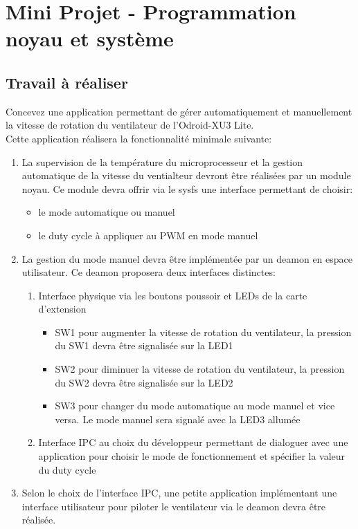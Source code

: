\section{Mini Projet - Programmation noyau et système}
\subsection{Travail à réaliser}
Concevez une application permettant de gérer automatiquement et manuellement la vitesse de rotation du ventilateur de l'Odroid-XU3 Lite.\\
Cette application réalisera la fonctionnalité minimale suivante:
\begin{enumerate}
	\item La supervision de la température du microprocesseur et la gestion automatique de la vitesse du ventialteur devront être réalisées par un module noyau. Ce module devra offrir via le sysfs une interface permettant de choisir:
	\begin{itemize}
		\item le mode automatique ou manuel
		\item le duty cycle à appliquer au PWM en mode manuel
	\end{itemize}
	\item La gestion du mode manuel devra être implémentée par un deamon en espace utilisateur. Ce deamon proposera deux interfaces distinctes:
	\begin{enumerate}
		\item Interface physique via les boutons poussoir et LEDs de la carte d'extension
		\begin{itemize}
			\item SW1 pour augmenter la vitesse de rotation du ventilateur, la pression du SW1 devra être signalisée sur la LED1
			\item SW2 pour diminuer la vitesse de rotation du ventilateur, la pression du SW2 devra être signalisée sur la LED2
			\item SW3 pour changer du mode automatique au mode manuel et vice versa. Le mode manuel sera signalé avec la LED3 allumée
		\end{itemize}
		\item Interface IPC au choix du développeur permettant de dialoguer avec une application pour choisir le mode de fonctionnement et spécifier la valeur du duty cycle
	\end{enumerate}
	\item Selon le choix de l'interface IPC, une petite application implémentant une interface utilisateur pour piloter le ventilateur via le deamon devra être réalisée.
\end{enumerate}

